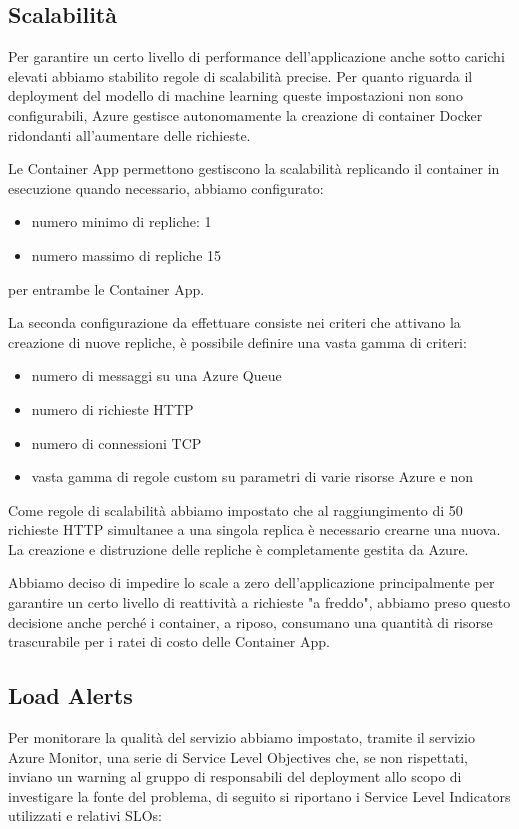 \subsection{Scalabilità}
Per garantire un certo livello di performance dell'applicazione anche sotto carichi elevati abbiamo stabilito regole di scalabilità precise. Per quanto riguarda il deployment del modello di machine learning queste impostazioni non sono configurabili, Azure gestisce autonomamente la creazione di container Docker ridondanti all'aumentare delle richieste.

Le Container App permettono gestiscono la scalabilità replicando il container in esecuzione quando necessario, abbiamo configurato:
\begin{itemize}
    \item numero minimo di repliche: 1
    \item numero massimo di repliche 15
\end{itemize}
per entrambe le Container App.

La seconda configurazione da effettuare consiste nei criteri che attivano la creazione di nuove repliche, è possibile definire una vasta gamma di criteri:
\begin{itemize}
    \item numero di messaggi su una Azure Queue
    \item numero di richieste HTTP
    \item numero di connessioni TCP
    \item vasta gamma di regole custom su parametri di varie risorse Azure e non
\end{itemize}

Come regole di scalabilità abbiamo impostato che al raggiungimento di 50 richieste HTTP simultanee a una singola replica è necessario crearne una nuova. La creazione e distruzione delle repliche è completamente gestita da Azure.

Abbiamo deciso di impedire lo scale a zero dell'applicazione principalmente per garantire un certo livello di reattività a richieste "a freddo", abbiamo preso questo decisione anche perché i container, a riposo, consumano una quantità di risorse trascurabile per i ratei di costo delle Container App.

\subsection{Load Alerts}
Per monitorare la qualità del servizio abbiamo impostato, tramite il servizio Azure Monitor, una serie di Service Level Objectives che, se non rispettati, inviano un warning al gruppo di responsabili del deployment allo scopo di investigare la fonte del problema, di seguito si riportano i Service Level Indicators utilizzati e relativi SLOs:

